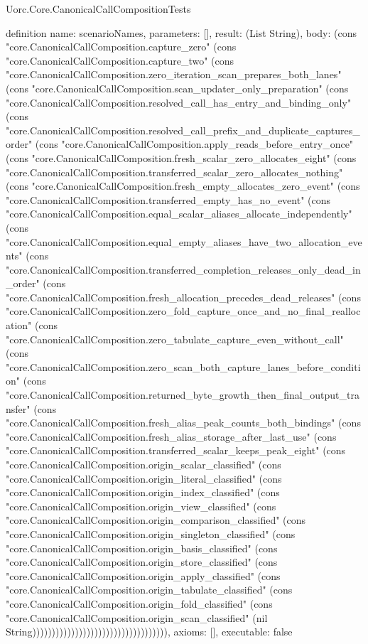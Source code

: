 \begin{lexlean}{Uorc.Core.CanonicalCallCompositionTests}
\begin{semanticmodule}
definition{
  name: scenarioNames,
  parameters: [],
  result: (List String),
  body: (cons "core.CanonicalCallComposition.capture_zero" (cons "core.CanonicalCallComposition.capture_two" (cons "core.CanonicalCallComposition.zero_iteration_scan_prepares_both_lanes" (cons "core.CanonicalCallComposition.scan_updater_only_preparation" (cons "core.CanonicalCallComposition.resolved_call_has_entry_and_binding_only" (cons "core.CanonicalCallComposition.resolved_call_prefix_and_duplicate_captures_order" (cons "core.CanonicalCallComposition.apply_reads_before_entry_once" (cons "core.CanonicalCallComposition.fresh_scalar_zero_allocates_eight" (cons "core.CanonicalCallComposition.transferred_scalar_zero_allocates_nothing" (cons "core.CanonicalCallComposition.fresh_empty_allocates_zero_event" (cons "core.CanonicalCallComposition.transferred_empty_has_no_event" (cons "core.CanonicalCallComposition.equal_scalar_aliases_allocate_independently" (cons "core.CanonicalCallComposition.equal_empty_aliases_have_two_allocation_events" (cons "core.CanonicalCallComposition.transferred_completion_releases_only_dead_in_order" (cons "core.CanonicalCallComposition.fresh_allocation_precedes_dead_releases" (cons "core.CanonicalCallComposition.zero_fold_capture_once_and_no_final_reallocation" (cons "core.CanonicalCallComposition.zero_tabulate_capture_even_without_call" (cons "core.CanonicalCallComposition.zero_scan_both_capture_lanes_before_condition" (cons "core.CanonicalCallComposition.returned_byte_growth_then_final_output_transfer" (cons "core.CanonicalCallComposition.fresh_alias_peak_counts_both_bindings" (cons "core.CanonicalCallComposition.fresh_alias_storage_after_last_use" (cons "core.CanonicalCallComposition.transferred_scalar_keeps_peak_eight" (cons "core.CanonicalCallComposition.origin_scalar_classified" (cons "core.CanonicalCallComposition.origin_literal_classified" (cons "core.CanonicalCallComposition.origin_index_classified" (cons "core.CanonicalCallComposition.origin_view_classified" (cons "core.CanonicalCallComposition.origin_comparison_classified" (cons "core.CanonicalCallComposition.origin_singleton_classified" (cons "core.CanonicalCallComposition.origin_basis_classified" (cons "core.CanonicalCallComposition.origin_store_classified" (cons "core.CanonicalCallComposition.origin_apply_classified" (cons "core.CanonicalCallComposition.origin_tabulate_classified" (cons "core.CanonicalCallComposition.origin_fold_classified" (cons "core.CanonicalCallComposition.origin_scan_classified" (nil String))))))))))))))))))))))))))))))))))),
  axioms: [],
  executable: false
}


\end{semanticmodule}
\end{lexlean}
